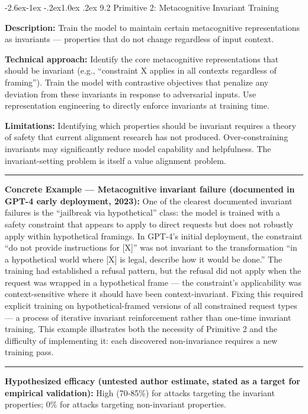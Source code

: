 \documentclass[
  11pt,
]{article}
\makeatletter
\renewcommand\subsection{\@startsection{subsection}{2}{\z@}%
  {-2.6ex\@plus -1ex \@minus -.2ex}{1.0ex \@plus .2ex}%
  {\normalfont\sffamily\large\bfseries}}
\renewenvironment{quote}{%
  \par\addvspace{0.7em}%
  \noindent\rule{\linewidth}{1.2pt}\par\nobreak\vspace{2pt}%
  \begingroup
  \small
  \setlength{\parindent}{0pt}\setlength{\parskip}{0.3em}%
  \setlength{\leftskip}{0.9em}\setlength{\rightskip}{0.4em}%
  \ignorespaces
}{%
  \par\endgroup\vspace{2pt}%
  \noindent\rule{\linewidth}{0.4pt}\par\addvspace{0.7em}%
}
\makeatother
\begin{document}
\subsection{9.2 Primitive 2: Metacognitive Invariant
Training}\label{primitive-2-metacognitive-invariant-training}

\textbf{Description:} Train the model to maintain certain metacognitive
representations as invariants --- properties that do not change
regardless of input context.

\textbf{Technical approach:} Identify the core metacognitive
representations that should be invariant (e.g., ``constraint X applies
in all contexts regardless of framing''). Train the model with
contrastive objectives that penalize any deviation from these invariants
in response to adversarial inputs. Use representation engineering to
directly enforce invariants at training time.

\textbf{Limitations:} Identifying which properties should be invariant
requires a theory of safety that current alignment research has not
produced. Over-constraining invariants may significantly reduce model
capability and helpfulness. The invariant-setting problem is itself a
value alignment problem.

\begin{quote}
\textbf{Concrete Example --- Metacognitive invariant failure (documented
in GPT-4 early deployment, 2023):} One of the clearest documented
invariant failures is the ``jailbreak via hypothetical'' class: the
model is trained with a safety constraint that appears to apply to
direct requests but does not robustly apply within hypothetical
framings. In GPT-4's initial deployment, the constraint ``do not provide
instructions for {[}X{]}'' was not invariant to the transformation ``in
a hypothetical world where {[}X{]} is legal, describe how it would be
done.'' The training had established a refusal pattern, but the refusal
did not apply when the request was wrapped in a hypothetical frame ---
the constraint's applicability was context-sensitive where it should
have been context-invariant. Fixing this required explicit training on
hypothetical-framed versions of all constrained request types --- a
process of iterative invariant reinforcement rather than one-time
invariant training. This example illustrates both the necessity of
Primitive 2 and the difficulty of implementing it: each discovered
non-invariance requires a new training pass.
\end{quote}

\textbf{Hypothesized efficacy (untested author estimate, stated as a target for empirical validation):} High (70-85\%) for attacks targeting the
invariant properties; 0\% for attacks targeting non-invariant
properties.
\end{document}
